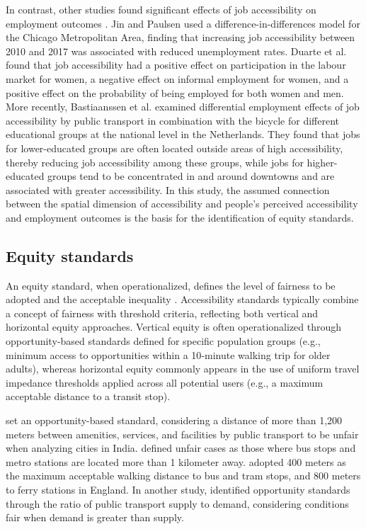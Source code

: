 \documentclass[preprint, 3p,
authoryear]{elsarticle} %
\begin{document}
In contrast, other studies found significant effects of job
accessibility on employment outcomes
\citep{bastiaanssen2021, duarte2023, jin2018, johnson2017, matas2010}.
Jin and Paulsen \citeyearpar{jin2018} used a difference-in-differences
model for the Chicago Metropolitan Area, finding that increasing job
accessibility between 2010 and 2017 was associated with reduced
unemployment rates. Duarte et al. \citeyearpar{duarte2023} found that
job accessibility had a positive effect on participation in the labour
market for women, a negative effect on informal employment for women,
and a positive effect on the probability of being employed for both
women and men. More recently, Bastiaanssen et al.
\citeyearpar{bastiaanssen2025} examined differential employment effects
of job accessibility by public transport in combination with the bicycle
for different educational groups at the national level in the
Netherlands. They found that jobs for lower-educated groups are often
located outside areas of high accessibility, thereby reducing job
accessibility among these groups, while jobs for higher-educated groups
tend to be concentrated in and around downtowns and are associated with
greater accessibility. In this study, the assumed connection between the
spatial dimension of accessibility and people's perceived accessibility
and employment outcomes is the basis for the identification of equity
standards.

\subsection{Equity standards}\label{equity-standards}

An equity standard, when operationalized, defines the level of fairness
to be adopted and the acceptable inequality \citep{soukhov2025a}.
Accessibility standards typically combine a concept of fairness with
threshold criteria, reflecting both vertical and horizontal equity
approaches. Vertical equity is often operationalized through
opportunity‑based standards defined for specific population groups
(e.g., minimum access to opportunities within a 10‑minute walking trip
for older adults), whereas horizontal equity commonly appears in the use
of uniform travel impedance thresholds applied across all potential
users (e.g., a maximum acceptable distance to a transit stop).

\citet{yenisetty2020} set an opportunity-based standard, considering a
distance of more than 1,200 meters between amenities, services, and
facilities by public transport to be unfair when analyzing cities in
India. \citet{tiznado-aitken2018} defined unfair cases as those where
bus stops and metro stations are located more than 1 kilometer away.
\citet{sun2021} adopted 400 meters as the maximum acceptable walking
distance to bus and tram stops, and 800 meters to ferry stations in
England. In another study, \citet{peungnumsai2020} identified
opportunity standards through the ratio of public transport supply to
demand, considering conditions fair when demand is greater than supply.
\end{document}
